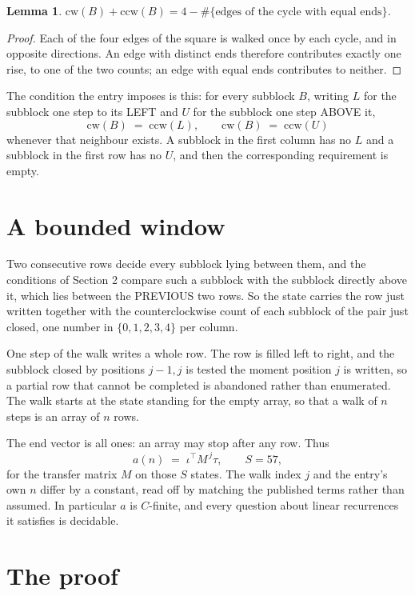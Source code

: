 \documentclass[11pt,a4paper]{article}
\theoremstyle{plain}
\newtheorem{lemma}[theorem]{Lemma}
\theoremstyle{definition}
\begin{document}
\begin{lemma}\label{lem:sum}
$\mathrm{cw}(B)+\mathrm{ccw}(B)=4-\#\{\text{edges of the cycle with equal ends}\}$.
\end{lemma}

\begin{proof}
Each of the four edges of the square is walked once by each cycle, and in opposite directions.
An edge with distinct ends therefore contributes exactly one rise, to one of the two counts;
an edge with equal ends contributes to neither.
\end{proof}

The condition the entry imposes is this: for every subblock $B$, writing $L$ for the subblock one step to its LEFT and $U$ for the subblock one step ABOVE it,
\[
\mathrm{cw}(B)\;=\;\mathrm{ccw}(L),\qquad \mathrm{cw}(B)\;=\;\mathrm{ccw}(U)
\]
whenever that neighbour exists. A subblock in the first column has no $L$ and a subblock in the first row has no $U$, and then the corresponding requirement is empty.

\section{A bounded window}

Two consecutive rows decide every subblock lying between them, and the conditions of Section 2 compare such a subblock with the subblock directly above it, which lies between the PREVIOUS two rows. So the state carries the row just written together with the counterclockwise count of each subblock of the pair just closed, one number in $\{0,1,2,3,4\}$ per column.

One step of the walk writes a whole row. The row is filled left to right, and the subblock
closed by positions $j-1,j$ is tested the moment position $j$ is written, so a partial row that
cannot be completed is abandoned rather than enumerated. The walk starts at the state standing
for the empty array, so that a walk of $n$ steps is an array of $n$ rows.

The end vector is all ones: an array may stop after any row. Thus
\[
a(n)\;=\;\iota^{\!\top}M^{\,j}\tau ,\qquad S=57,
\]
for the transfer matrix $M$ on those $S$ states. The walk index $j$ and the entry's own $n$
differ by a constant, read off by matching the published terms rather than assumed. In
particular $a$ is $C$-finite, and every question about linear recurrences it satisfies is
decidable.

\section{The proof}
\end{document}
